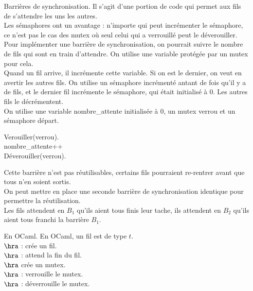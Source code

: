 \documentclass[french, 11pt]{article}
\begin{document}
\begin{defi}{Barrières de synchronisation.}{}
    Il s'agit d'une portion de code qui permet aux fils de s'attendre les uns les autres.\\
    Les sémaphores ont un avantage : n'importe qui peut incrémenter le sémaphore, ce n'est pas le cas des mutex où seul celui qui a verrouillé peut le déverouiller.\\
    Pour implémenter une barrière de synchronisation, on pourrait suivre le nombre de fils qui sont en train d'attendre. On utilise une variable protégée par un mutex pour cela.\\
    Quand un fil arrive, il incrémente cette variable. Si on est le dernier, on veut en avertir les autres fils. On utilise un sémaphore incrémenté antant de fois qu'il y a de fils, et le dernier fil incrémente le sémaphore, qui était initialisé à 0. Les autres fils le décrémentent.\\
    On utilise une variable nombre\_attente initialisée à 0, un mutex verrou et un sémaphore départ.\\
    \begin{algorithm}[H]
        \caption{Barrière de synchronisation.}
        Verouiller(verrou).\\
        nombre\_attente++\\
        Déverouiller(verrou).\\
    \end{algorithm}
    Cette barrière n'est pas réutilisables, certains fils pourraient re-rentrer avant que tous n'en soient sortis.\\
    On peut mettre en place une seconde barrière de synchronisation identique pour permettre la réutilisation.\\
    Les fils attendent en $B_1$ qu'ils aient tous finis leur tache, ils attendent en $B_2$ qu'ils aient tous franchi la barrière $B_1$.
\end{defi}

\begin{defi}{En OCaml.}{}
    En OCaml, un fil est de type $t$.\\
    $\hra$  : crée un fil.\\
    $\hra$  : attend la fin du fil.\\
    $\hra$  crée un mutex.\\
    $\hra$  : verrouille le mutex.\\
    $\hra$  : déverrouille le mutex.
\end{defi}
\end{document}
